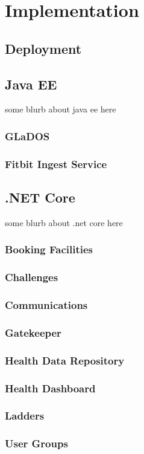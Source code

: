 \chapter{Implementation}

\section{Deployment}

\section{Java EE}
some blurb about java ee here

\subsection{GLaDOS}

\subsection{Fitbit Ingest Service}

\section{.NET Core}
some blurb about .net core here

\subsection{Booking Facilities}

\subsection{Challenges}

\subsection{Communications}

\subsection{Gatekeeper}

\subsection{Health Data Repository}

\subsection{Health Dashboard}

\subsection{Ladders}

\subsection{User Groups}




